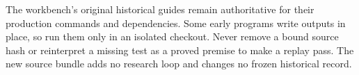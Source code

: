 The workbench's original historical guides remain authoritative for their production commands and dependencies. Some early programs write outputs in place, so run them only in an isolated checkout. Never remove a bound source hash or reinterpret a missing test as a proved premise to make a replay pass. The new source bundle adds no research loop and changes no frozen historical record.
